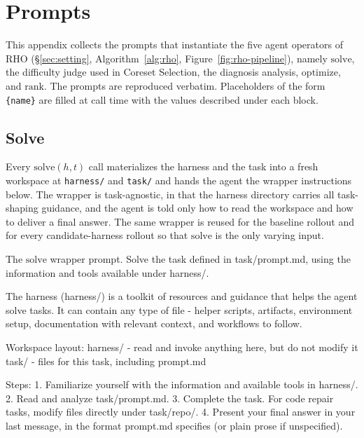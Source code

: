 \documentclass{llmxive}
\providecommand{\method}{\textsc{RHO}}
\begin{document}
\section{Prompts}\label{app:prompts}

This appendix collects the prompts that instantiate the five agent
operators of \method{} (\S\ref{sec:setting}, Algorithm~\ref{alg:rho},
Figure~\ref{fig:rho-pipeline}), namely $\mathrm{solve}$, the difficulty judge
used in Coreset Selection, the diagnosis analysis, $\mathrm{optimize}$,
and $\mathrm{rank}$. The prompts are reproduced verbatim. Placeholders
of the form \texttt{\{name\}} are filled at call time with the values
described under each block.

\subsection{Solve}

Every $\mathrm{solve}(h, t)$ call materializes the harness and the
task into a fresh workspace at \texttt{harness/} and \texttt{task/} and
hands the agent the wrapper instructions below. The wrapper is
task-agnostic, in that the harness directory carries all task-shaping
guidance, and the agent is told only how to read the workspace and how
to deliver a final answer. The same wrapper is reused for the
baseline rollout and for every candidate-harness rollout so that
$\mathrm{solve}$ is the only varying input.

\begin{promptbox}{The $\mathrm{solve}$ wrapper prompt.}
Solve the task defined in task/prompt.md, using the information and tools available under harness/.

The harness (harness/) is a toolkit of resources and guidance that helps the agent solve tasks. It can contain any type of file - helper scripts, artifacts, environment setup, documentation with relevant context, and workflows to follow.

Workspace layout:
  harness/   - read and invoke anything here, but do not modify it
  task/      - files for this task, including prompt.md

Steps:
1. Familiarize yourself with the information and available tools in harness/.
2. Read and analyze task/prompt.md.
3. Complete the task. For code repair tasks, modify files directly under task/repo/.
4. Present your final answer in your last message, in the format prompt.md specifies (or plain prose if unspecified).
\end{promptbox}
\end{document}
